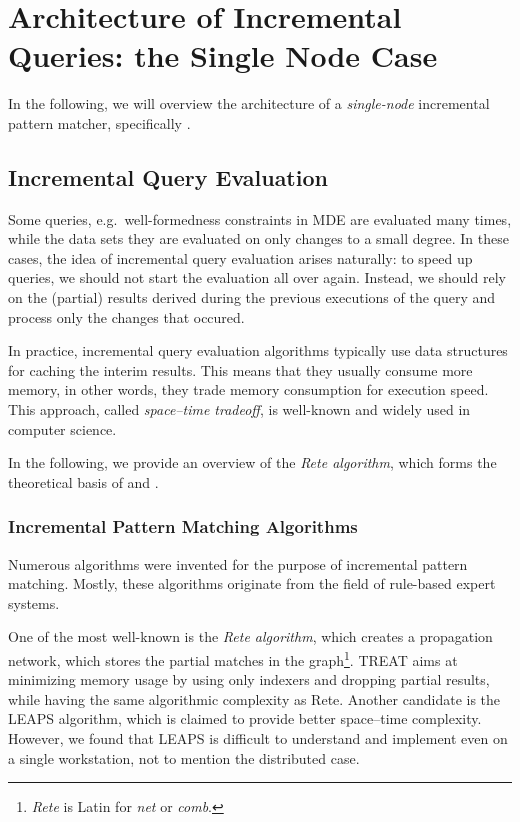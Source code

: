 \section{Architecture of Incremental Queries: the Single Node Case}
\label{eiq-architecture}

In the following, we will overview the architecture of a \emph{single-node} incremental pattern matcher, specifically \eiq{}.


\subsection{Incremental Query Evaluation}
\label{rete}

Some queries, e.g.\ well-formedness constraints in MDE are evaluated many times, while the data sets they are evaluated on only changes to a small degree. In these cases, the idea of incremental query evaluation arises naturally: to speed up queries, we should not start the evaluation all over again. Instead, we should rely on the (partial) results derived during the previous executions of the query and process only the changes that occured.
 
In practice, incremental query evaluation algorithms typically use data structures for caching the interim results. This  means that they usually consume more memory, in other words, they trade memory consumption for execution speed. This approach, called \emph{space--time tradeoff}, is well-known and widely used in computer science.

In the following, we provide an overview of the \emph{Rete algorithm}, which forms the theoretical basis of \eiq{} and \iqd{}.

\subsubsection{Incremental Pattern Matching Algorithms}

Numerous algorithms were invented for the purpose of incremental pattern matching. Mostly, these algorithms originate from the field of rule-based expert systems.

One of the most well-known is the \emph{Rete algorithm}, which creates a propagation network, which stores the partial matches in the graph\footnote{\emph{Rete} is Latin for \emph{net} or \emph{comb}.}. TREAT \cite{Miranker:1991:OPT:627280.627434} aims at minimizing memory usage by using only indexers and dropping partial results, while having the same algorithmic complexity as Rete. Another candidate is the LEAPS \cite{Batory:1994:LA:899216} algorithm, which is claimed to provide better space--time complexity. However, we found that LEAPS is difficult to understand and implement even on a single workstation, not to mention the distributed case. 

